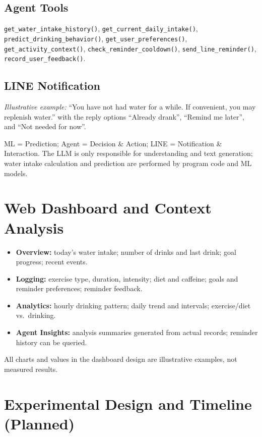 \documentclass[conference]{IEEEtran}
\begin{document}
\subsection{Agent Tools}
\texttt{get\_water\_intake\_history()}, \texttt{get\_current\_daily\_intake()}, \texttt{predict\_drinking\_behavior()}, \texttt{get\_user\_preferences()}, \texttt{get\_activity\_context()}, \texttt{check\_reminder\_cooldown()}, \texttt{send\_line\_reminder()}, \texttt{record\_user\_feedback()}.

\subsection{LINE Notification}
\textit{Illustrative example:} ``You have not had water for a while. If convenient, you may replenish water.'' with the reply options ``Already drank'', ``Remind me later'', and ``Not needed for now''.

ML = Prediction; Agent = Decision \& Action; LINE = Notification \& Interaction. The LLM is only responsible for understanding and text generation; water intake calculation and prediction are performed by program code and ML models.

\section{Web Dashboard and Context Analysis}

\begin{itemize}
\item \textbf{Overview:} today's water intake; number of drinks and last drink; goal progress; recent events.
\item \textbf{Logging:} exercise type, duration, intensity; diet and caffeine; goals and reminder preferences; reminder feedback.
\item \textbf{Analytics:} hourly drinking pattern; daily trend and intervals; exercise/diet vs.\ drinking.
\item \textbf{Agent Insights:} analysis summaries generated from actual records; reminder history can be queried.
\end{itemize}
All charts and values in the dashboard design are illustrative examples, not measured results.

\section{Experimental Design and Timeline (Planned)}
\end{document}
